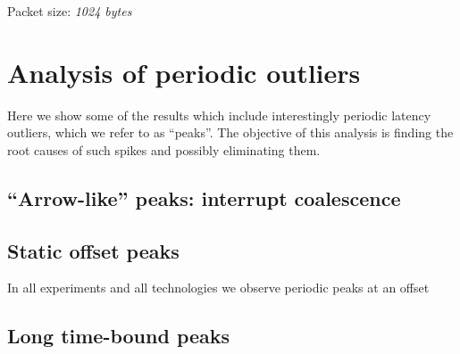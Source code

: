 \documentclass{article}
\begin{document}
\noindent
Packet size: \textit{1024 bytes}


\section*{Analysis of periodic outliers}
Here we show some of the results which include interestingly periodic latency 
outliers, which we refer to as ``peaks''. The objective of this analysis is finding
the root causes of such spikes and possibly eliminating them.

\subsection*{``Arrow-like'' peaks: interrupt coalescence}

\subsection*{Static offset peaks}
In all experiments and all technologies we observe periodic peaks at an offset

\subsection*{Long time-bound peaks}
\end{document}
